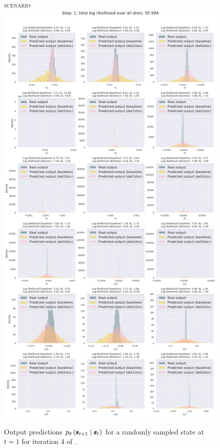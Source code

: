 \begin{figure}
    \centering
    \textsc{\MakeLowercase{\ws{} scenario}}\\
    \medskip
    \includegraphics[width=.8\textwidth,trim=0 0 0 70,clip]{img/windyslope/output/output_distribution_step1_delta_all}
    \caption{Output predictions $\ptheta \protect\given*{\vns}{\vs}$ for a randomly sampled state at $t=1$ for iteration 4 of \dettostoc{}.}
    \label{fig:output_distribution_step1_dettostoc}
\end{figure}%

